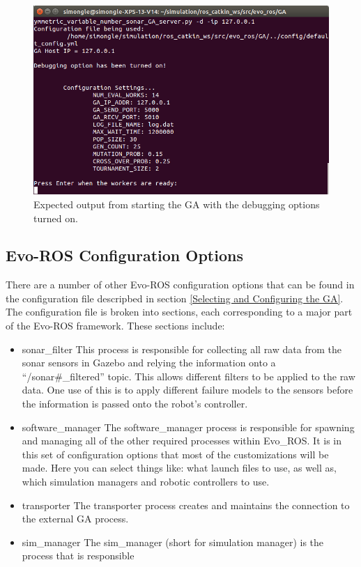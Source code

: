 \documentclass{report}
\begin{document}
 \begin{figure}[h]
 	\centering
 	\includegraphics[scale=0.33]{Images/GA_Terminal_Output.png}
 	\caption{Expected output from starting the GA with the debugging options turned on.}
 	\label{GA_terminal_output}
 \end{figure}



\subsection{Evo-ROS Configuration Options}
There are a number of other Evo-ROS configuration options that can be found in the configuration file descripbed in section \ref{Selecting and Configuring the GA}. The configuration file is broken into sections, each corresponding to a major part of the Evo-ROS framework. These sections include: 

\begin{itemize}
	\item sonar\_filter
		\subitem This process is responsible for collecting all raw data from the sonar sensors in Gazebo and relying the information onto a ``/sonar\#\_filtered'' topic. This allows different filters to be applied to the raw data. One use of this is to apply different failure models to the sensors before the information is passed onto the robot's controller.
	\item software\_manager
		\subitem The software\_manager process is responsible for spawning and managing all of the other required processes within Evo\_ROS. It is in this set of configuration options that most of the customizations will be made. Here you can select things like: what launch files to use, as well as, which simulation managers and robotic controllers to use.
	\item transporter
		\subitem The transporter process creates and maintains the connection to the external GA process. 
	\item sim\_manager
		\subitem The sim\_manager (short for simulation manager) is the process that is responsible 
\end{itemize}
\end{document}
